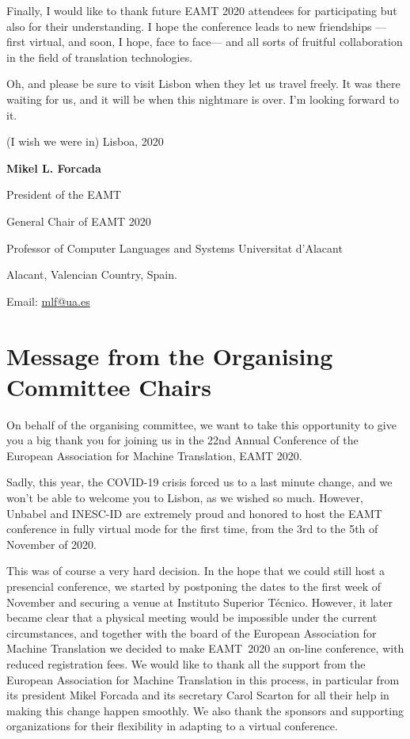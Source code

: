 \documentclass[a4paper,11pt,twoside]{book}
\begin{document}
Finally, I would like to thank future EAMT 2020 attendees for participating but also for their understanding. I hope
the conference leads to new friendships ---first virtual, and soon, I hope, face to face--- and all sorts of fruitful collaboration in the field of translation technologies. 

Oh, and please be sure to visit Lisbon when they let us travel freely. It was there waiting for us, and it will be when this nightmare is over. I'm looking forward to it.

\vspace{1cm}

\noindent (I wish we were in) Lisboa, 2020

\vspace{1cm}

\noindent \textbf{Mikel L. Forcada}

\noindent President of the EAMT

\noindent General Chair of EAMT 2020

\noindent Professor of Computer Languages and Systems
\noindent Universitat d'Alacant

\noindent Alacant, Valencian Country, Spain.

\noindent Email: \url{mlf@ua.es}


\chapter*{Message from the Organising Committee Chairs}

On behalf of the organising committee, we want to take this opportunity to give you a big thank you for joining us in the 22nd Annual Conference of the European Association for Machine Translation, EAMT 2020. 

Sadly, this year, the COVID-19 crisis forced us to a last minute change, and we won’t be able to welcome you to Lisbon, as we wished so much. However, Unbabel and INESC-ID are extremely proud and honored to host the EAMT conference in fully virtual mode for the first time, from the 3rd to the 5th of November of 2020. 

This was of course a very hard decision. In the hope that we could still host a presencial conference, we started by postponing the dates to the first week of November and securing a venue at Instituto Superior Técnico. However, it later became clear that a physical meeting would be impossible under the current circumstances, and together with the board of the European Association for Machine Translation we decided to make EAMT~2020 an on-line conference, with reduced registration fees. We would like to thank all the support from the European Association for Machine Translation in this process, in particular from its president Mikel Forcada and its secretary Carol Scarton for all their help in making this change happen smoothly. We also thank the sponsors and supporting organizations for their flexibility in adapting to a virtual conference.
\end{document}
